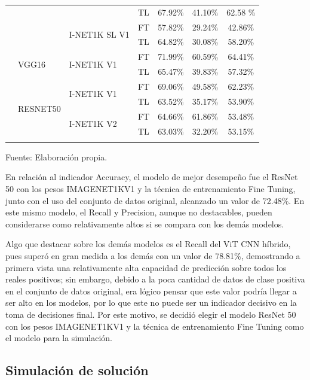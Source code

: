 \begin{table}[H]
\begin{tabular}{m{2cm}m{2.5cm}m{3cm}m{1.8cm}ccc}
		{} & {} & {} & {TL} & {67.92\%} & {41.10\%} & {62.58	\%} \\
		{} & {} & \multirow{2}{4cm}{I-NET1K SL V1} & {FT} & {57.82\%} & {29.24\%} & {42.86\%} \\
		{} & {} & {} & {TL} & {64.82\%} & {30.08\%} & {58.20\%} \\
		{} & \multirow{2}{4cm}{VGG16} & \multirow{2}{4cm}{I-NET1K V1} & {FT} & {71.99\%} & {60.59\%} & {64.41\%} \\
		{} & {} & {} & {TL} & {65.47\%} & {39.83\%} & {57.32\%} \\
		{} & \multirow{4}{4cm}{RESNET50} & \multirow{2}{4cm}{I-NET1K V1} & {FT} & {69.06\%} & {49.58\%} & {62.23\%} \\
		{} & {} & {} & {TL} & {63.52\%} & {35.17\%} & {53.90\%} \\
		{} & {} & \multirow{2}{4cm}{I-NET1K V2} & {FT} & {64.66\%} & {61.86\%} & {53.48\%} \\
		{} & {} & {} & {TL} & {63.03\%} & {32.20\%} & {53.15\%} \\
		\specialrule{.1em}{.05em}{.05em}
	\end{tabular}
	\begin{flushleft}	
		\small Fuente: Elaboración propia.
	\end{flushleft}
\end{table}

En relación al indicador Accuracy, el modelo de mejor desempeño fue el ResNet 50 con los pesos IMAGENET1KV1 y la técnica de entrenamiento Fine Tuning, junto con el uso del conjunto de datos original, alcanzado un valor de 72.48\%. En este mismo modelo, el Recall y Precision, aunque no destacables, pueden considerarse como relativamente altos si se compara con los demás modelos.

Algo que destacar sobre los demás modelos es el Recall del ViT CNN híbrido, pues superó en gran medida a los demás con un valor de 78.81\%, demostrando a primera vista una relativamente alta capacidad de predicción sobre todos los reales positivos; sin embargo, debido a la poca cantidad de datos de clase positiva en el conjunto de datos original, era lógico pensar que este valor podría llegar a ser alto en los modelos, por lo que este no puede ser un indicador decisivo en la toma de decisiones final. Por este motivo, se decidió elegir el modelo ResNet 50 con los pesos IMAGENET1KV1 y la técnica de entrenamiento Fine Tuning como el modelo para la simulación.

\subsection{Simulación de solución}

